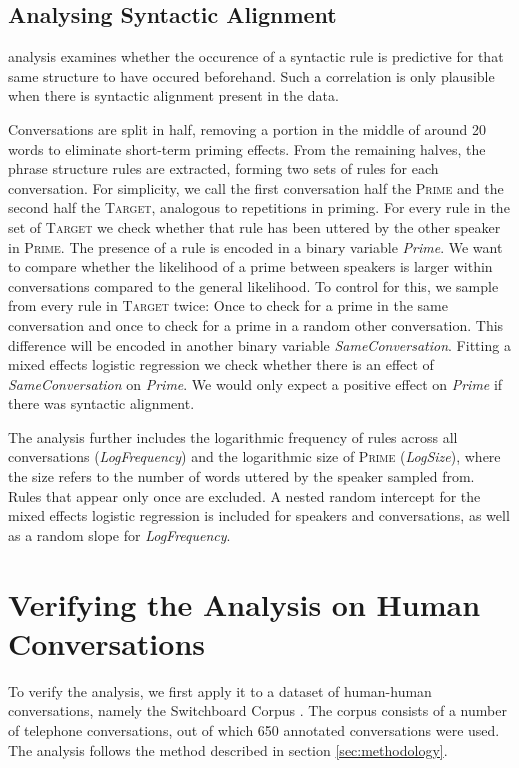 \documentclass[11pt]{article}
\begin{document}
\subsection{Analysing Syntactic Alignment}

 analysis examines whether the occurence of a syntactic rule is predictive for that same structure to have occured beforehand. Such a correlation is only plausible when there is syntactic alignment present in the data.

Conversations are split in half, removing a portion in the middle of around 20 words to eliminate short-term priming effects. From the remaining halves, the phrase structure rules are extracted, forming two sets of rules for each conversation. For simplicity, we call the first conversation half the \textsc{Prime} and the second half the \textsc{Target}, analogous to repetitions in priming. For every rule in the set of \textsc{Target} we check whether that rule has been uttered by the other speaker in \textsc{Prime}. The presence of a rule is encoded in a binary variable \textit{Prime}. We want to compare whether the likelihood of a prime between speakers is larger within conversations compared to the general likelihood. To control for this, we sample from every rule in \textsc{Target} twice: Once to check for a prime in the same conversation and once to check for a prime in a random other conversation. This difference will be encoded in another binary variable \textit{SameConversation}. Fitting a mixed effects logistic regression we check whether there is an effect of \textit{SameConversation} on \textit{Prime}. We would only expect a positive effect on \textit{Prime} if there was syntactic alignment.

The analysis further includes the logarithmic frequency of rules across all conversations (\textit{LogFrequency}) and the logarithmic size of \textsc{Prime} (\textit{LogSize}), where the size refers to the number of words uttered by the speaker sampled from. Rules that appear only once are excluded. A nested random intercept for the mixed effects logistic regression is included for speakers and conversations, as well as a random slope for \textit{LogFrequency}.

\section{Verifying the Analysis on Human Conversations}
To verify the analysis, we first apply it to a dataset of human-human conversations, namely the Switchboard Corpus \cite{marcus1994penn}. The corpus consists of a number of telephone conversations, out of which 650 annotated conversations were used. The analysis follows the method described in section \ref{sec:methodology}.
\end{document}
